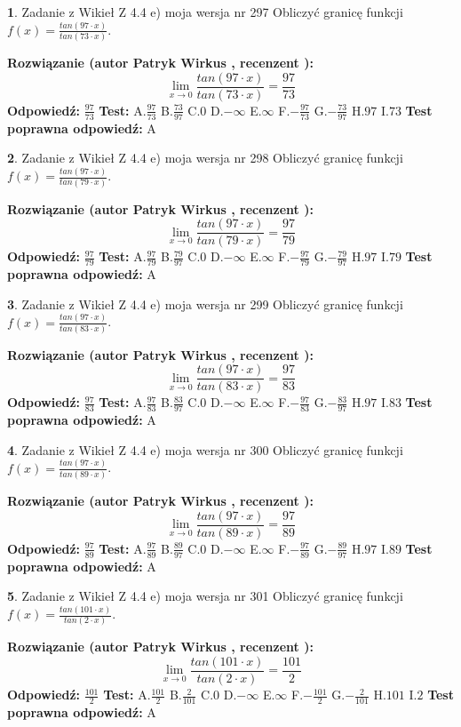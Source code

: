 \documentclass[12pt, a4paper]{article}
\theoremstyle{definition} %
\newtheorem{zad}{}
\newcommand{\zadStart}[1]{\begin{zad}#1\newline}
\newcommand{\zadStop}{\end{zad}}
\newcommand{\rozwStart}[2]{\noindent \textbf{Rozwiązanie (autor #1 , recenzent #2): }\newline}
\newcommand{\rozwStop}{\newline}
\newcommand{\odpStart}{\noindent \textbf{Odpowiedź:}\newline}
\newcommand{\odpStop}{\newline}
\newcommand{\testStart}{\noindent \textbf{Test:}\newline}
\newcommand{\testStop}{\newline}
\newcommand{\kluczStart}{\noindent \textbf{Test poprawna odpowiedź:}\newline}
\newcommand{\kluczStop}{\newline}
\begin{document}
\zadStart{Zadanie z Wikieł Z 4.4 e) moja wersja nr 297}
Obliczyć granicę funkcji $f(x)=\frac{tan(97\cdot x)}{tan(73\cdot x)}$.
\zadStop
\rozwStart{Patryk Wirkus}{}
$$\lim\limits_{x\to 0}\frac{tan(97\cdot x)}{tan(73\cdot x)}=
\frac{97}{73}$$
\rozwStop
\odpStart
$\frac{97}{73}$
\odpStop
\testStart
A.$\frac{97}{73}$
B.$\frac{73}{97}$
C.$0$
D.$-\infty$
E.$\infty$
F.$-\frac{97}{73}$
G.$-\frac{73}{97}$
H.$97$
I.$73$
\testStop
\kluczStart
A
\kluczStop



\zadStart{Zadanie z Wikieł Z 4.4 e) moja wersja nr 298}
Obliczyć granicę funkcji $f(x)=\frac{tan(97\cdot x)}{tan(79\cdot x)}$.
\zadStop
\rozwStart{Patryk Wirkus}{}
$$\lim\limits_{x\to 0}\frac{tan(97\cdot x)}{tan(79\cdot x)}=
\frac{97}{79}$$
\rozwStop
\odpStart
$\frac{97}{79}$
\odpStop
\testStart
A.$\frac{97}{79}$
B.$\frac{79}{97}$
C.$0$
D.$-\infty$
E.$\infty$
F.$-\frac{97}{79}$
G.$-\frac{79}{97}$
H.$97$
I.$79$
\testStop
\kluczStart
A
\kluczStop



\zadStart{Zadanie z Wikieł Z 4.4 e) moja wersja nr 299}
Obliczyć granicę funkcji $f(x)=\frac{tan(97\cdot x)}{tan(83\cdot x)}$.
\zadStop
\rozwStart{Patryk Wirkus}{}
$$\lim\limits_{x\to 0}\frac{tan(97\cdot x)}{tan(83\cdot x)}=
\frac{97}{83}$$
\rozwStop
\odpStart
$\frac{97}{83}$
\odpStop
\testStart
A.$\frac{97}{83}$
B.$\frac{83}{97}$
C.$0$
D.$-\infty$
E.$\infty$
F.$-\frac{97}{83}$
G.$-\frac{83}{97}$
H.$97$
I.$83$
\testStop
\kluczStart
A
\kluczStop



\zadStart{Zadanie z Wikieł Z 4.4 e) moja wersja nr 300}
Obliczyć granicę funkcji $f(x)=\frac{tan(97\cdot x)}{tan(89\cdot x)}$.
\zadStop
\rozwStart{Patryk Wirkus}{}
$$\lim\limits_{x\to 0}\frac{tan(97\cdot x)}{tan(89\cdot x)}=
\frac{97}{89}$$
\rozwStop
\odpStart
$\frac{97}{89}$
\odpStop
\testStart
A.$\frac{97}{89}$
B.$\frac{89}{97}$
C.$0$
D.$-\infty$
E.$\infty$
F.$-\frac{97}{89}$
G.$-\frac{89}{97}$
H.$97$
I.$89$
\testStop
\kluczStart
A
\kluczStop



\zadStart{Zadanie z Wikieł Z 4.4 e) moja wersja nr 301}
Obliczyć granicę funkcji $f(x)=\frac{tan(101\cdot x)}{tan(2\cdot x)}$.
\zadStop
\rozwStart{Patryk Wirkus}{}
$$\lim\limits_{x\to 0}\frac{tan(101\cdot x)}{tan(2\cdot x)}=
\frac{101}{2}$$
\rozwStop
\odpStart
$\frac{101}{2}$
\odpStop
\testStart
A.$\frac{101}{2}$
B.$\frac{2}{101}$
C.$0$
D.$-\infty$
E.$\infty$
F.$-\frac{101}{2}$
G.$-\frac{2}{101}$
H.$101$
I.$2$
\testStop
\kluczStart
A
\kluczStop
\end{document}
